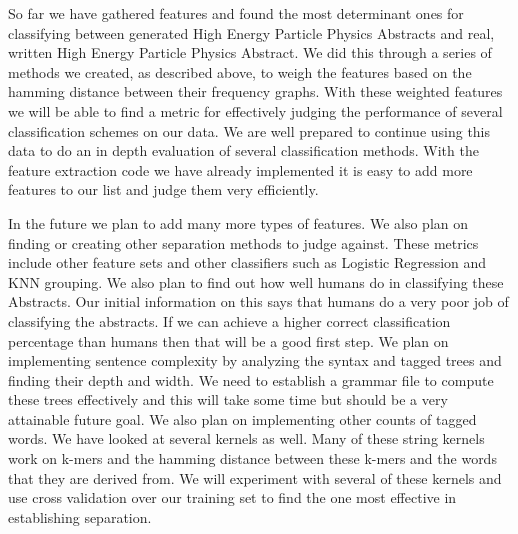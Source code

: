 
So far we have gathered features and found the most determinant ones for classifying between generated High Energy Particle Physics Abstracts and real, written High Energy Particle Physics Abstract.  We did this through a series of methods we created, as described above, to weigh the features based on the hamming distance between their frequency graphs.  With these weighted features we will be able to find a metric for effectively judging the performance of several classification schemes on our data.  We are well prepared to continue using this data to do an in depth evaluation of several classification methods.  With the feature extraction code we have already implemented it is easy to add more features to our list and judge them very efficiently.

In the future we plan to add many more types of features.  We also plan on finding or creating other separation methods to judge against.  These metrics include other feature sets and other classifiers such as Logistic Regression and KNN grouping.  We also plan to find out how well humans do in classifying these Abstracts.  Our initial information on this says that humans do a very poor job of classifying the abstracts.  If we can achieve a higher correct classification percentage than humans then that will be a good first step.  We plan on implementing sentence complexity by analyzing the syntax and tagged trees and finding their depth and width.  We need to establish a grammar file to compute these trees effectively and this will take some time but should be a very attainable future goal.  We also plan on implementing other counts of tagged words.  We have looked at several kernels as well.  Many of these string kernels work on k-mers and the hamming distance between these k-mers and the words that they are derived from.  We will experiment with several of these kernels and use cross validation over our training set to find the one most effective in establishing separation.